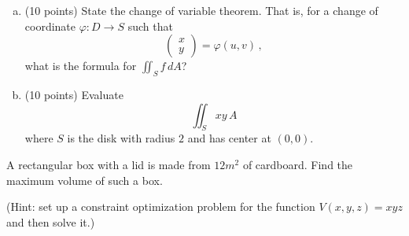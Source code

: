 \documentclass[12pt]{article}
\begin{document}
\newpage
\begin{problem}
    \begin{enumerate}[(a)]
        \item (10 points) State the change of variable theorem. That is, for a change of coordinate
        $\varphi: D \to S$ such that
        \begin{equation*}
            \begin{pmatrix}
                x \\ y
            \end{pmatrix}
            = \varphi(u,v) \,,
        \end{equation*}
        what is the formula for 
        $\iint_S f \, dA$?
    \item (10 points) Evaluate
        \begin{equation*}
            \iint_S xy \, A
        \end{equation*}
        where $S$ is the disk with radius $2$ and has center at $(0,0)$.
        
\end{enumerate}
\end{problem}



\newpage

\begin{problem}
    A rectangular box with a lid is made from $12 m^2$ of cardboard.
    Find the maximum volume of such a box.

    (Hint: set up a constraint optimization problem for the function $V(x,y,z) = xyz$ 
    and then solve it.)
\end{problem}
%
\end{document}
